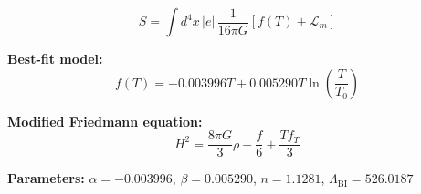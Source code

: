 
\begin{equation}
  S = \int d^4x \, |e| \, \frac{1}{16\pi G} \left[ f(T) + \mathcal{L}_m \right]
\end{equation}

\textbf{Best-fit model:}
\begin{equation}
  f(T) = -0.003996 T + 0.005290 T \ln\!\left(\frac{T}{T_0}\right)
\end{equation}

\textbf{Modified Friedmann equation:}
\begin{equation}
  H^2 = \frac{8\pi G}{3} \rho - \frac{f}{6} + \frac{T f_T}{3}
\end{equation}

\textbf{Parameters:}
$\alpha = -0.003996$, \quad
$\beta = 0.005290$, \quad
$n = 1.1281$, \quad
$\Lambda_{\text{BI}} = 526.0187$